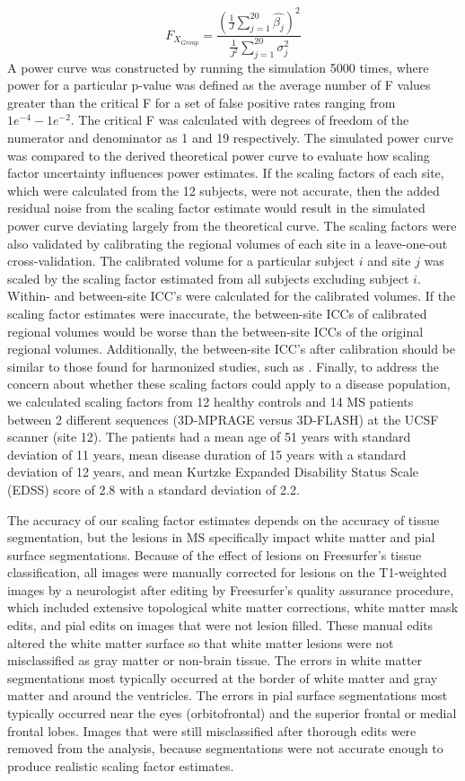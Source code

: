 \documentclass{article}
\begin{document}
\begin{equation}
F_{X_{Group}} = \frac{(\frac{1}{J}\sum_{j=1}^{20}\hat{\beta_j})^2}{\frac{1}{J^2}\sum_{j=1}^{20}\sigma^2_j}
\end{equation}
A power curve was constructed by running the simulation 5000 times, where power for a particular p-value was defined as the average number of F values greater than the critical F for a set of false positive rates ranging from $1e^{-4} - 1e^{-2}$. The critical F was calculated with degrees of freedom of the numerator and denominator as 1 and 19 respectively. The simulated power curve was compared to the derived theoretical power curve to evaluate how scaling factor uncertainty influences power estimates. If the scaling factors of each site, which were calculated from the 12 subjects, were not accurate, then the added residual noise from the scaling factor estimate would result in the simulated power curve deviating largely from the theoretical curve.
The scaling factors were also validated by calibrating the regional volumes of each site in a leave-one-out cross-validation. The calibrated volume for a particular subject $i$ and site $j$ was scaled by the scaling factor estimated from all subjects excluding subject $i$. Within- and between-site ICC's were calculated for the calibrated volumes. If the scaling factor estimates were inaccurate, the between-site ICCs of calibrated regional volumes would be worse than the between-site ICCs of the original regional volumes. Additionally, the between-site ICC's after calibration should be similar to those found for harmonized studies, such as \cite{cannon2014}.
Finally, to address the concern about whether these scaling factors could apply to a disease population, we calculated scaling factors from 12 healthy controls and 14 MS patients between 2 different sequences (3D-MPRAGE  versus 3D-FLASH) at the UCSF scanner (site 12). The patients had a mean age of 51 years with standard deviation of 11 years, mean disease duration of 15 years with a standard deviation of 12 years, and mean Kurtzke Expanded Disability Status Scale (EDSS) \cite{Kurtzke_1983} score of 2.8 with a standard deviation of 2.2. 

The accuracy of our scaling factor estimates depends on the accuracy of tissue segmentation, but the lesions in MS specifically impact white matter and pial surface segmentations. Because of the effect of lesions on Freesurfer's tissue classification, all images were manually corrected for lesions on the T1-weighted images by a neurologist after editing by Freesurfer's quality assurance procedure, which included extensive topological white matter corrections, white matter mask edits, and pial edits on images that were not lesion filled.  These manual edits altered the white matter surface so that white matter lesions were not misclassified as gray matter or non-brain tissue. The errors in white matter segmentations most typically occurred at the border of white matter and gray matter and around the ventricles. The errors in pial surface segmentations most typically occurred near the eyes (orbitofrontal) and the superior frontal or medial frontal lobes. Images that were still misclassified after thorough edits were removed from the analysis, because segmentations were not accurate enough to produce realistic scaling factor estimates.
\end{document}
